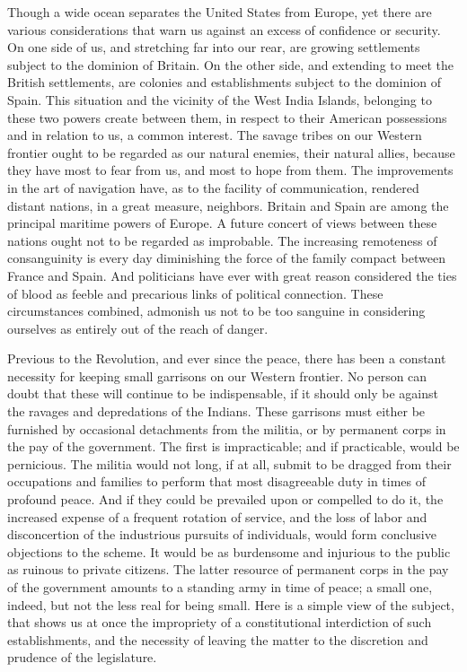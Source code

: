 Though a wide ocean separates the United States from Europe, yet there are various considerations that warn us against an excess of confidence or security. 
On one side of us, and stretching far into our rear, are growing settlements subject to the dominion of Britain. 
On the other side, and extending to meet the British settlements, are colonies and establishments subject to the dominion of Spain. 
This situation and the vicinity of the West India Islands, belonging to these two powers create between them, in respect to their American possessions and in relation to us, a common interest. 
The savage tribes on our Western frontier ought to be regarded as our natural enemies, their natural allies, because they have most to fear from us, and most to hope from them. 
The improvements in the art of navigation have, as to the facility of communication, rendered distant nations, in a great measure, neighbors. 
Britain and Spain are among the principal maritime powers of Europe. 
A future concert of views between these nations ought not to be regarded as improbable. 
The increasing remoteness of consanguinity is every day diminishing the force of the family compact between France and Spain. 
And politicians have ever with great reason considered the ties of blood as feeble and precarious links of political connection. 
These circumstances combined, admonish us not to be too sanguine in considering ourselves as entirely out of the reach of danger.

Previous to the Revolution, and ever since the peace, there has been a constant necessity for keeping small garrisons on our Western frontier. 
No person can doubt that these will continue to be indispensable, if it should only be against the ravages and depredations of the Indians. 
These garrisons must either be furnished by occasional detachments from the militia, or by permanent corps in the pay of the government. 
The first is impracticable; and if practicable, would be pernicious. 
The militia would not long, if at all, submit to be dragged from their occupations and families to perform that most disagreeable duty in times of profound peace. 
And if they could be prevailed upon or compelled to do it, the increased expense of a frequent rotation of service, and the loss of labor and disconcertion of the industrious pursuits of individuals, would form conclusive objections to the scheme. 
It would be as burdensome and injurious to the public as ruinous to private citizens. 
The latter resource of permanent corps in the pay of the government amounts to a standing army in time of peace; a small one, indeed, but not the less real for being small. 
Here is a simple view of the subject, that shows us at once the impropriety of a constitutional interdiction of such establishments, and the necessity of leaving the matter to the discretion and prudence of the legislature.

